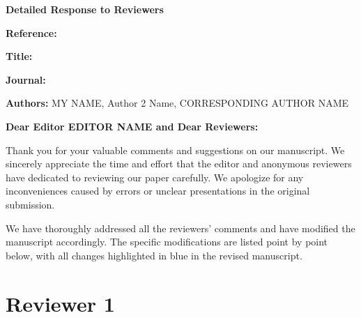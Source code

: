 \documentclass[12pt]{article}
\begin{document}

\begin{center}
{\Large \textbf{Detailed Response to Reviewers}}
\end{center}

\bigskip


\textbf{Reference:} \manuscriptNumer

\textbf{Title:} \myTitle

\textbf{Journal:} \journalName

\textbf{Authors:} MY NAME, Author 2 Name, CORRESPONDING AUTHOR NAME

\bigskip


\textbf{Dear Editor {EDITOR NAME} and Dear Reviewers:}

Thank you for your valuable comments and suggestions on our manuscript. We sincerely appreciate the time and effort that the editor and anonymous reviewers have dedicated to reviewing our paper carefully. We apologize for any inconveniences caused by errors or unclear presentations in the original submission. 

We have thoroughly addressed all the reviewers' comments and have modified the manuscript accordingly. The specific modifications are listed point by point below, with all changes highlighted in blue in the revised manuscript.


\section*{Reviewer 1}
\end{document}
